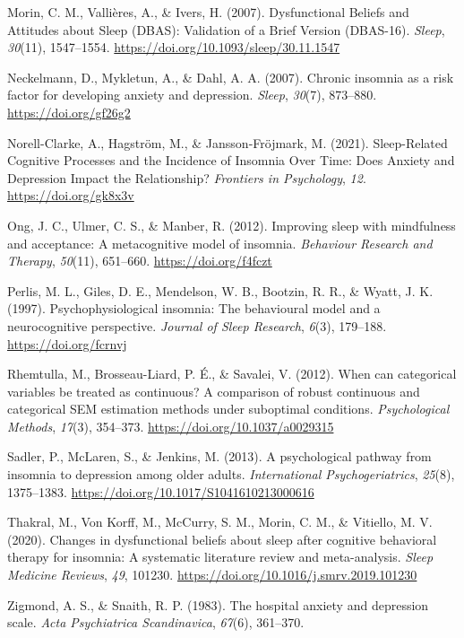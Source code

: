 \documentclass[
  ,doc,11pt, twoside,floatsintext]{apa6}
\newlength{\cslhangindent}
\newlength{\cslentryspacingunit} %
\newenvironment{CSLReferences}[2] %
 {%
  \setlength{\parindent}{0pt}
  \ifodd #1
  \let\oldpar\par
  \def\par{\hangindent=\cslhangindent\oldpar}
  \fi
  \setlength{\parskip}{#2\cslentryspacingunit}
 }%
 {}
\begin{document}
\begin{CSLReferences}{1}{0}
\leavevmode{}%
Morin, C. M., Vallières, A., \& Ivers, H. (2007). Dysfunctional {Beliefs} and {Attitudes} about {Sleep} ({DBAS}): {Validation} of a {Brief Version} ({DBAS-16}). \emph{Sleep}, \emph{30}(11), 1547--1554. \url{https://doi.org/10.1093/sleep/30.11.1547}

\leavevmode{}%
Neckelmann, D., Mykletun, A., \& Dahl, A. A. (2007). Chronic insomnia as a risk factor for developing anxiety and depression. \emph{Sleep}, \emph{30}(7), 873--880. \url{https://doi.org/gf26g2}

\leavevmode{}%
Norell-Clarke, A., Hagström, M., \& Jansson-Fröjmark, M. (2021). Sleep-{Related Cognitive Processes} and the {Incidence} of {Insomnia Over Time}: {Does Anxiety} and {Depression Impact} the {Relationship}? \emph{Frontiers in Psychology}, \emph{12}. \url{https://doi.org/gk8x3v}

\leavevmode{}%
Ong, J. C., Ulmer, C. S., \& Manber, R. (2012). Improving sleep with mindfulness and acceptance: {A} metacognitive model of insomnia. \emph{Behaviour Research and Therapy}, \emph{50}(11), 651--660. \url{https://doi.org/f4fczt}

\leavevmode{}%
Perlis, M. L., Giles, D. E., Mendelson, W. B., Bootzin, R. R., \& Wyatt, J. K. (1997). Psychophysiological insomnia: The behavioural model and a neurocognitive perspective. \emph{Journal of Sleep Research}, \emph{6}(3), 179--188. \url{https://doi.org/fcrnvj}

\leavevmode{}%
Rhemtulla, M., Brosseau-Liard, P. É., \& Savalei, V. (2012). When can categorical variables be treated as continuous? {A} comparison of robust continuous and categorical {SEM} estimation methods under suboptimal conditions. \emph{Psychological Methods}, \emph{17}(3), 354--373. \url{https://doi.org/10.1037/a0029315}

\leavevmode{}%
Sadler, P., McLaren, S., \& Jenkins, M. (2013). A psychological pathway from insomnia to depression among older adults. \emph{International Psychogeriatrics}, \emph{25}(8), 1375--1383. \url{https://doi.org/10.1017/S1041610213000616}

\leavevmode{}%
Thakral, M., Von Korff, M., McCurry, S. M., Morin, C. M., \& Vitiello, M. V. (2020). Changes in dysfunctional beliefs about sleep after cognitive behavioral therapy for insomnia: {A} systematic literature review and meta-analysis. \emph{Sleep Medicine Reviews}, \emph{49}, 101230. \url{https://doi.org/10.1016/j.smrv.2019.101230}

\leavevmode{}%
Zigmond, A. S., \& Snaith, R. P. (1983). The hospital anxiety and depression scale. \emph{Acta Psychiatrica Scandinavica}, \emph{67}(6), 361--370.

\end{CSLReferences}
\end{document}
